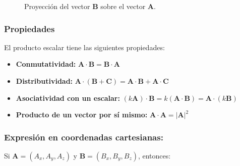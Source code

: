 \documentclass{book}
\begin{document}
\begin{figure}[H]
\centering
{}
\caption{Proyección del vector $\mathbf{B}$ sobre el vector $\mathbf{A}$.}
\label{fig:proyeccion_vectorial_B_sobre_A}
\end{figure}

\subsubsection{Propiedades}

El producto escalar tiene las siguientes propiedades:

\begin{itemize}
 \item[\textbullet] \textbf{Conmutatividad:} $\mathbf{A} \cdot \mathbf{B} = \mathbf{B} \cdot \mathbf{A}$
\item[\textbullet] \textbf{Distributividad:} $\mathbf{A} \cdot (\mathbf{B} + \mathbf{C}) = \mathbf{A} \cdot \mathbf{B} + \mathbf{A} \cdot \mathbf{C}$
 \item[\textbullet] \textbf{Asociatividad con un escalar:} $(k\mathbf{A}) \cdot \mathbf{B} = k(\mathbf{A} \cdot \mathbf{B}) = \mathbf{A} \cdot (k\mathbf{B})$
 \item[\textbullet] \textbf{Producto de un vector por sí mismo:} $\mathbf{A} \cdot \mathbf{A} = |\mathbf{A}|^2$
\end{itemize}

\subsubsection{Expresión en coordenadas cartesianas:} 

Si $\mathbf{A} = (A_x, A_y, A_z)$ y $\mathbf{B} = (B_x, B_y, B_z)$, entonces:
\end{document}
